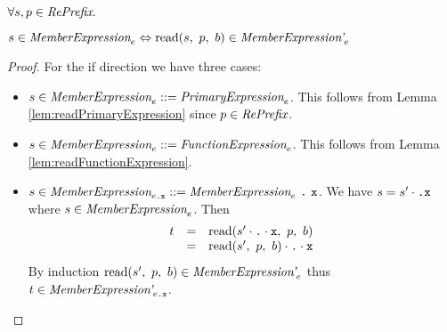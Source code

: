 \documentclass[preprint,10pt]{sigplanconf}
\begin{document}
\begin{lemma}\mbox{}

  \( \forall s, p \in \textit{RePrefix}. \)

  \( s \in \textit{MemberExpression}_{e} \Leftrightarrow 
  \textrm{read}(s,~p,~b) \in \textit{MemberExpression'}_{e} \)
\end{lemma}
\begin{proof}
  For the if direction we have three cases:
  \begin{itemize}
  \item \( s \in \textit{MemberExpression}_{e} ::=
    \textit{PrimaryExpression}_{e} \). This follows from Lemma
    \ref{lem:readPrimaryExpression} since \( p \in \textit{RePrefix} \).
    
  \item \( s \in \textit{MemberExpression}_{e} ::=
    \textit{FunctionExpression}_{e} \). This follows from Lemma
    \ref{lem:readFunctionExpression}.
    
  \item \( s \in \textit{MemberExpression}_{e\texttt{.\texttt{x}}} ::=
    \textit{MemberExpression}_{e} ~\texttt{.}~\texttt{x} \). We have 
    \( s = s' \cdot \texttt{.} \texttt{x} \) where \( s \in
    \textit{MemberExpression}_{e} \). Then
    \[
    \begin{array}{rcl}
      t &=& \textrm{read}(s' \cdot \texttt{.} \cdot \texttt{x},~p,~b)
      \\
      &=& \textrm{read}(s',~p,~b) \cdot \texttt{.} \cdot \texttt{x}
    \end{array}
    \]
    By induction \( \textrm{read}(s',~p,~b) \in \textit{MemberExpression'}_{e}
    \) thus \( t \in \textit{MemberExpression'}_{e\texttt{.\texttt{x}}} \).
  \end{itemize}
\end{proof}
\end{document}

